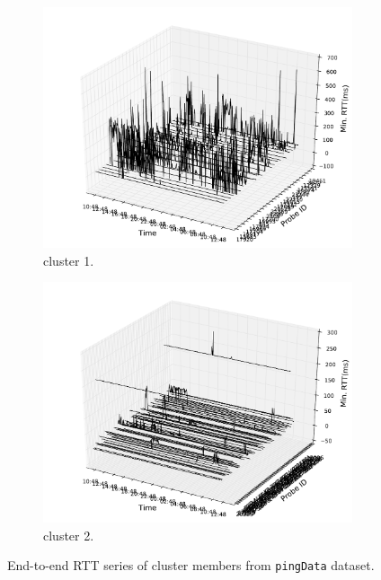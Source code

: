 \begin{figure}[!htb]
    \centering
    \begin{subfigure}[b]{\textwidth}
	\centering
	\includegraphics[width=\textwidth]{gfx/chap3/rtt3d_ping_cls1.pdf}
	\caption{cluster 1.}
	\label{fig:ping_cls1}
	\end{subfigure}
	\begin{subfigure}[b]{\textwidth}
	\centering
	\includegraphics[width=\textwidth]{gfx/chap3/rtt3d_ping_cls2.pdf}
	\caption{cluster 2.}
	\label{fig:ping_cls2}
	\end{subfigure}
\caption{End-to-end RTT series of cluster members from \texttt{pingData} dataset.}
\label{fig:rtt_ping}
\end{figure}

